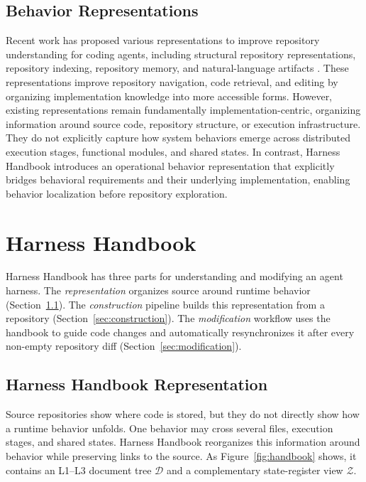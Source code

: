 \documentclass[]{ailab}
\begin{document}
\subsection{Behavior Representations}

Recent work has proposed various representations to improve repository understanding for coding agents, including structural repository representations, repository indexing, repository memory, and natural-language artifacts \citep{cherny2026repository,bhola2026code,wang2025improving,pan2026natural}. These representations improve repository navigation, code retrieval, and editing by organizing implementation knowledge into more accessible forms. However, existing representations remain fundamentally implementation-centric, organizing information around source code, repository structure, or execution infrastructure. They do not explicitly capture how system behaviors emerge across distributed execution stages, functional modules, and shared states. In contrast, Harness Handbook introduces an operational behavior representation that explicitly bridges behavioral requirements and their underlying implementation, enabling behavior localization before repository exploration.



\section{Harness Handbook}
\label{sec:overview}
Harness Handbook has three parts for understanding and modifying an agent
harness. The \emph{representation} organizes source around runtime
behavior (Section~\ref{sec:representation}). The \emph{construction} pipeline
builds this representation from a repository
(Section~\ref{sec:construction}). The \emph{modification} workflow uses the
handbook to guide code changes and automatically resynchronizes it after every
non-empty repository diff (Section~\ref{sec:modification}).

\subsection{Harness Handbook Representation}
\label{sec:representation}

Source repositories show where code is stored, but they do not directly show
how a runtime behavior unfolds. One behavior may cross several files, execution
stages, and shared states. Harness Handbook reorganizes this information around
behavior while preserving links to the source. As
Figure~\ref{fig:handbook} shows, it contains an L1--L3 document tree
$\mathcal{D}$ and a complementary state-register view $\mathcal{Z}$.
\end{document}
